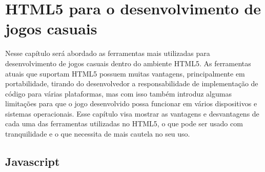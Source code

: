 \section{HTML5 para o desenvolvimento de jogos casuais}

Nesse capítulo será abordado as ferramentas mais utilizadas para
desenvolvimento de jogos casuais dentro do ambiente HTML5.
As ferramentas atuais que suportam HTML5 possuem muitas vantagens,
principalmente em portabilidade, tirando do desenvolvedor a
responsabilidade de implementação de código para várias plataformas, mas
com isso também introduz algumas limitações para que o jogo
desenvolvido possa funcionar em vários dispositivos e sistemas
operacionais. Esse capítulo visa mostrar as vantagens e desvantagens
de cada uma das ferramentas utilizadas no HTML5, o que pode ser usado
com tranquilidade e o que necessita de mais cautela no seu uso.

\subsection{Javascript}

